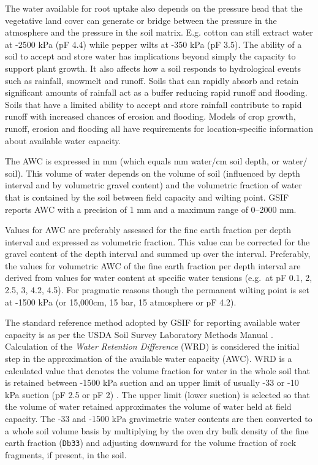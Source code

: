 \documentclass[11pt]{krantz}
\theoremstyle{definition}
\theoremstyle{definition}
\theoremstyle{definition}
\theoremstyle{remark}
\begin{document}
The water available for root uptake also depends on the pressure head
that the vegetative land cover can generate or bridge between the
pressure in the atmosphere and the pressure in the soil matrix. E.g.
cotton can still extract water at -2500 kPa (pF 4.4) while pepper wilts
at -350 kPa (pF 3.5). The ability of a soil to accept and store water
has implications beyond simply the capacity to support plant growth. It
also affects how a soil responds to hydrological events such as
rainfall, snowmelt and runoff. Soils that can rapidly absorb and retain
significant amounts of rainfall act as a buffer reducing rapid runoff
and flooding. Soils that have a limited ability to accept and store
rainfall contribute to rapid runoff with increased chances of erosion
and flooding. Models of crop growth, runoff, erosion and flooding all
have requirements for location-specific information about available
water capacity.

The AWC is expressed in mm (which equals mm water/cm soil depth, or
water/ soil). This volume of water depends on the volume of soil
(influenced by depth interval and by volumetric gravel content) and the
volumetric fraction of water that is contained by the soil between field
capacity and wilting point. GSIF reports AWC with a precision of 1 mm
and a maximum range of 0--2000 mm.

Values for AWC are preferably assessed for the fine earth fraction per
depth interval and expressed as volumetric fraction. This value can be
corrected for the gravel content of the depth interval and summed up
over the interval. Preferably, the values for volumetric AWC of the fine
earth fraction per depth interval are derived from values for water
content at specific water tensions (e.g.~at pF 0.1, 2, 2.5, 3, 4.2,
4.5). For pragmatic reasons though the permanent wilting point is set at
-1500 kPa (or 15,000cm, 15 bar, 15 atmosphere or pF 4.2).

The standard reference method adopted by GSIF for reporting available
water capacity is as per the USDA Soil Survey Laboratory Methods Manual
\citep[ p.137]{Burt2004SSIR}. Calculation of the \emph{Water Retention
Difference} (WRD) is considered the initial step in the approximation of
the available water capacity (AWC). WRD is a calculated value that
denotes the volume fraction for water in the whole soil that is retained
between -1500 kPa suction and an upper limit of usually -33 or -10 kPa
suction (pF 2.5 or pF 2) \citep[ p.137]{Burt2004SSIR}. The upper limit
(lower suction) is selected so that the volume of water retained
approximates the volume of water held at field capacity. The -33 and
-1500 kPa gravimetric water contents are then converted to a whole soil
volume basis by multiplying by the oven dry bulk density of the fine
earth fraction (\texttt{Db33}) and adjusting downward for the volume
fraction of rock fragments, if present, in the soil.
\end{document}
